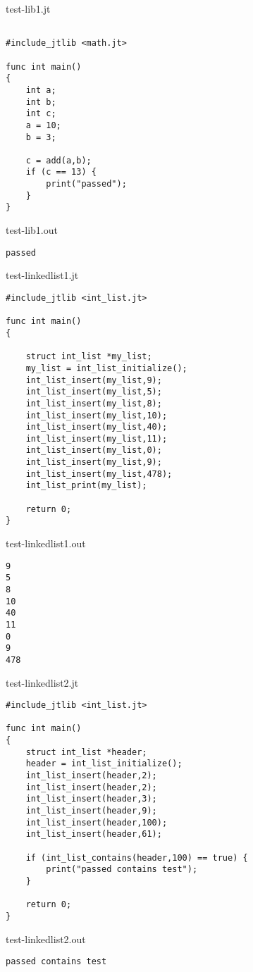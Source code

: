\documentclass{article}
\begin{document}
\newpage


test-lib1.jt
\begin{lstlisting}

#include_jtlib <math.jt>

func int main()
{
	int a;
	int b;
	int c;
	a = 10;
	b = 3;

	c = add(a,b);
	if (c == 13) {
		print("passed");
	}
}
\end{lstlisting}

test-lib1.out
\begin{lstlisting}
passed
\end{lstlisting}

\newpage


test-linkedlist1.jt
\begin{lstlisting}
#include_jtlib <int_list.jt>

func int main()
{

	struct int_list *my_list;
	my_list = int_list_initialize();
	int_list_insert(my_list,9);
	int_list_insert(my_list,5);
	int_list_insert(my_list,8);
	int_list_insert(my_list,10);
	int_list_insert(my_list,40);
	int_list_insert(my_list,11);
	int_list_insert(my_list,0);
	int_list_insert(my_list,9);
	int_list_insert(my_list,478);
	int_list_print(my_list);

	return 0;
}
\end{lstlisting}

test-linkedlist1.out
\begin{lstlisting}
9
5
8
10
40
11
0
9
478
\end{lstlisting}

\newpage

test-linkedlist2.jt
\begin{lstlisting}
#include_jtlib <int_list.jt>

func int main()
{
	struct int_list *header;
	header = int_list_initialize();
	int_list_insert(header,2);
	int_list_insert(header,2);
	int_list_insert(header,3);
	int_list_insert(header,9);
	int_list_insert(header,100);
	int_list_insert(header,61);

	if (int_list_contains(header,100) == true) {
		print("passed contains test");
	}

	return 0;
}
\end{lstlisting}

test-linkedlist2.out
\begin{lstlisting}
passed contains test
\end{lstlisting}

\newpage
\end{document}
